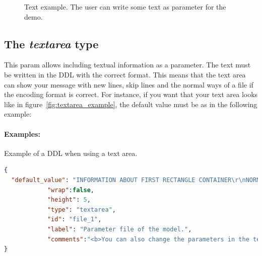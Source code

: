 \begin{figure}[h]
\centering
{}
\caption{Text example. The user can write some text as parameter for the demo.}
\label{fig:text_example}
\end{figure}


\subsection{The \emph{textarea} type}

This param allows including textual information as a parameter. The text must be written in the DDL with the correct format. This means that the text area can show your message with new lines, skip lines and the normal ways of a file if the encoding format is correct. For instance, if you want that your text area looks like in figure~\ref{fig:textarea_example}, the default value must be as in the following example:

\paragraph{Examples:}
\label{textarea_example}
Example of a DDL when using a text area. %
\begin{lstlisting}[language=json,firstnumber=1]
{
  "default_value": "INFORMATION ABOUT FIRST RECTANGLE CONTAINER\r\nNORMALIZED IMAGE DIMENSION\r\nwidth_float = 1.413793\r\n",
            "wrap":false,
            "height": 5,
            "type": "textarea",
            "id": "file_1",
            "label": "Parameter file of the model.",
            "comments":"<b>You can also change the parameters in the text.<b>",
}
\end{lstlisting}


